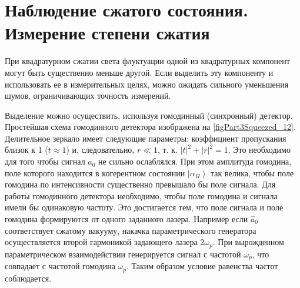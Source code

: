 \section{Наблюдение сжатого состояния. Измерение степени сжатия}

При квадратурном сжатии света флуктуации одной из квадратурных
компонент могут быть существенно меньше другой. Если выделить эту
компоненту и использовать ее в измерительных целях, можно ожидать
сильного уменьшения шумов, ограничивающих точность измерений. 



Выделение можно осуществить, используя гомодинный (синхронный)
детектор. Простейшая схема гомодинного детектора изображена на
\autoref{figPart3Squeezed_12}. Делительное зеркало имеет следующие
параметры: коэффициент пропускания близок к 1 ($t \approx 1$) и,
следовательно, $r \ll 1$, т. к. $\left|t\right|^2 +\left|r\right|^2 =
1$. Это необходимо для того чтобы сигнал $\hat{a}_0$ не сильно
ослаблялся. При этом амплитуда гомодина, поле которого находится в
когерентном состоянии $\left|\alpha_{H}\right>$ так велика, чтобы поле
гомодина по интенсивности существенно превышало бы поле сигнала. Для
работы гомодинного детектора необходимо, чтобы поле гомодина и сигнала
имели бы одинаковую частоту. Это достигается тем, что поле сигнала и
поле гомодина формируются от одного заданного лазера. Например если
$\hat{a}_0$ соответствует сжатому вакууму, накачка параметрического
генератора осуществляется второй гармоникой задающего лазера $2
\omega_p$. При вырожденном параметрическом взаимодействии генерируется
сигнал с частотой $\omega_p$, что совпадает с частотой гомодина
$\omega_p$. Таким образом условие равенства частот соблюдается.

